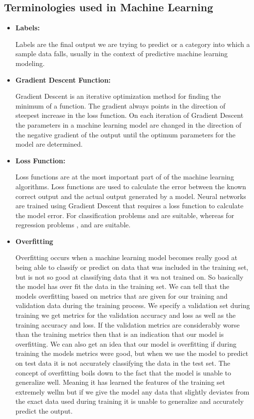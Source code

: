 \subsection{Terminologies used in Machine Learning}
\begin{itemize}
  \item  \textbf{Labels:}
  \par
  Labels are the final output we are trying to predict or a category into which a sample data falls, usually in the context of predictive machine learning modeling.
  \item  \textbf{Gradient Descent Function:}
  \par
  Gradient Descent is an iterative optimization method for finding the minimum of a function. The gradient always points in the direction of steepest increase in the loss function. On each iteration of Gradient Descent the parameters in a machine learning model are changed in the direction of the negative gradient of the output until the optimum parameters for the model are determined.
  \item \textbf{Loss Function:} 
  \par
  Loss functions are at the most important part of of the machine learning algorithms. Loss functions are used to calculate the error between the known correct output and the actual output generated by a model. Neural networks are trained using Gradient Descent that requires a loss function to calculate the model error. For classification problems  and  are suitable, whereas for regression problems ,  and  are suitable.
  \item  \textbf{Overfitting}
  \par
  Overfitting occurs when a machine learning model becomes really good at being able to classify or predict on data that was included in the training set, but is not so good at classifying data that it wa not trained on. So basically the model has over fit the data in the training set. We can tell that the
  models overfitting based on metrics that are given for our training and validation data during the training process. We specify a validation set during training we get metrics for the validation accuracy and loss as well as the training accuracy and loss. If the validation metrics are considerably worse than the training metrics then that is an indication that our model is overfitting. We can also get an idea that our model is overfitting if during training the models metrics were good, but when we use the model to predict on test data it is not accurately classifying the data in the test set. The concept of overfitting boils down to the fact that the model is unable to generalize well. Meaning it has learned the features of the training set extremely wellm but if we give the model any data that slightly deviates from the exact data used during training it is unable to generalize and accurately predict the output.

\end{itemize}
